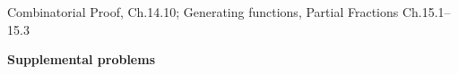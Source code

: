 \documentclass[handout]{mcs}
\begin{document}

\begin{staffnotes}
Combinatorial Proof, Ch.14.10;   Generating functions,
Partial Fractions Ch.15.1--15.3
\end{staffnotes}



\begin{center}
\textbf{\large Supplemental problems}
\end{center}




\end{document}
